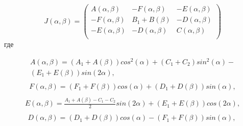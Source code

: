 \begin{equation} %
\label{eq:p3:24}
J \left(  \alpha , \beta  \right) = \left( \begin{matrix}
A \left(  \alpha , \beta  \right)   &  -F \left(  \alpha , \beta  \right)   &  -E \left(  \alpha , \beta  \right) \\
-F \left(  \alpha , \beta  \right)   &  B_{1}+B \left(  \beta  \right)   &  -D \left(  \alpha , \beta  \right) \\
-E \left(  \alpha , \beta  \right)   &  -D \left(  \alpha , \beta  \right)   &  C \left(  \alpha , \beta  \right) \\
\end{matrix}
\right) 
\end{equation}
где\par
\begin{equation}
\begin{multlined}
 A (  \alpha , \beta  ) = 
 ( A_{1}+A (  \beta  )  ) cos^{2} (  \alpha  ) + 
 ( C_{1}+C_{2} ) sin^{2} (  \alpha  ) - \nonumber \\
 ( E_{1}+E (  \beta  )  ) sin ( 2 \alpha  )    ,\nonumber \\
\end{multlined}
\end{equation}
\begin{equation}
\begin{multlined}
 F \left(  \alpha , \beta  \right) = \left( F_{1}+F \left(  \beta  \right)  \right) cos \left(  \alpha  \right) + \left( D_{1}+D \left(  \beta  \right)  \right) sin \left(  \alpha  \right)   ,\nonumber \\
\end{multlined}
\end{equation}
\begin{equation}
\begin{multlined}
 E \left(  \alpha , \beta  \right) =\frac{A_{1}+A \left(  \beta  \right) -C_{1}-C_{2}}{2}sin \left( 2 \alpha  \right) + \left( E_{1}+E \left(  \beta  \right)  \right) cos \left( 2 \alpha  \right)  ,\nonumber \\
\end{multlined}
\end{equation}
\begin{equation}
\begin{multlined}
 D \left(  \alpha , \beta  \right) = \left( D_{1}+D \left(  \beta  \right)  \right) cos \left(  \alpha  \right) - \left( F_{1}+F \left(  \beta  \right)  \right) sin \left(  \alpha  \right)   ,\ \nonumber \\
\end{multlined}
\end{equation}
